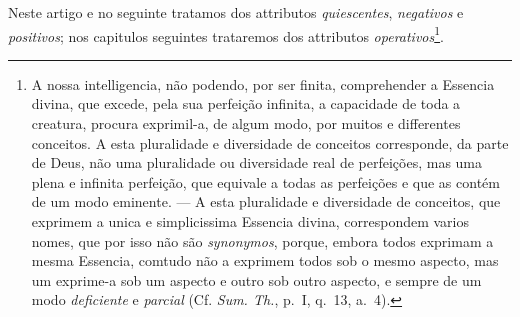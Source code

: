 Neste artigo e no seguinte tratamos dos attributos \emph{quiescentes}, \emph{negativos} e
\emph{positivos}; nos capitulos seguintes trataremos dos attributos
\emph{operativos}\footnote{A nossa intelligencia, não podendo, por ser finita,
comprehender a Essencia divina, que excede, pela sua perfeição infinita, a capacidade de
toda a creatura, procura exprimil-a, de algum modo, por muitos e differentes conceitos. A
esta pluralidade e diversidade de conceitos corresponde, da parte de Deus, não uma
pluralidade ou diversidade real de perfeições, mas uma plena e infinita perfeição, que
equivale a todas as perfeições e que as contém de um modo eminente. --- A esta
pluralidade e diversidade de conceitos, que exprimem a unica e simplicissima Essencia
divina, correspondem varios nomes, que por isso não são \emph{synonymos}, porque, embora
todos exprimam a mesma Essencia, comtudo não a exprimem todos sob o mesmo aspecto, mas um
exprime-a sob um aspecto e outro sob outro aspecto, e sempre de um modo \emph{deficiente}
e \emph{parcial} (Cf. \emph{Sum. Th.}, p.~I, q.~13, a.~4).}.
